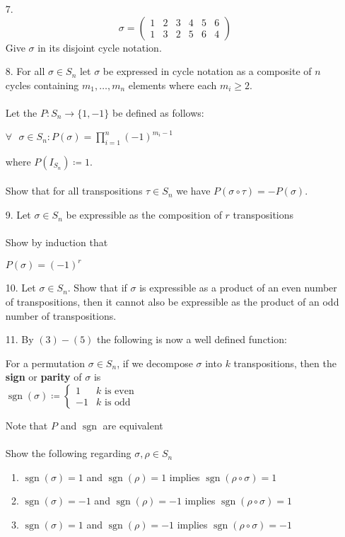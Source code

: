 \documentclass{article}
\begin{document}
\begin{itemize}
    \item [7.] \[
        \sigma = \begin{pmatrix}
        1 & 2 & 3 & 4 & 5 & 6 \\
        1 & 3 & 2 & 5 & 6 & 4
        \end{pmatrix}
        \]
    Give $\sigma$ in its disjoint cycle notation.
    \item [8.] For all $\sigma\in S_n$ let $\sigma$ be expressed in cycle notation as a composite of $n$ cycles containing $m_1,\dots,m_n$ elements where each $m_i \ge 2$. 
    \text{}\\\\Let the $P: S_n\rightarrow \{1, -1\}$ be defined as follows:
    \begin{center}
        $\forall\text{ }\sigma\in S_n\colon P(\sigma) = \prod_{i=1}^n(-1)^{m_i-1}$
    \end{center}
    where $P(I_{S_n}) \coloneq 1$. 
    \text{}\\\\Show that for all transpositions $\tau\in S_n$ we have $P(\sigma\circ\tau) = -P(\sigma)$.
    \item [9.] Let $\sigma\in S_n$ be expressible as the composition of $r$ transpositions\text{}\\\\Show by induction that
    \begin{center}
        $P(\sigma) = (-1)^r$
    \end{center}
    \item [10.] Let $\sigma\in S_n$. Show that if $\sigma$ is expressible as a product of an even number of transpositions, then it cannot also be expressible as the product of an odd number of transpositions.
    \item [11.] By $(3)-(5)$ the following is now a well defined function:
    \begin{center}
        For a permutation $\sigma\in S_n$, if we decompose $\sigma$ into $k$ transpositions, then the \textbf{sign} or \textbf{parity} of $\sigma$ is \text{}\\
        $\operatorname{sgn}(\sigma) \coloneq\begin{cases} 
      1 & k\text{ is even} \\
      -1 & k\text{ is odd}
    \end{cases}$
    \end{center}
    Note that $P$ and $\operatorname{sgn}$ are equivalent
    \text{}\\\\Show the following regarding $\sigma, \rho\in S_n$
    \begin{enumerate}
        \item $\operatorname{sgn}(\sigma) = 1$ and $\operatorname{sgn}(\rho) = 1$ implies $\operatorname{sgn}(\rho\circ\sigma) = 1$
        \item $\operatorname{sgn}(\sigma) = -1$ and $\operatorname{sgn}(\rho) = -1$ implies $\operatorname{sgn}(\rho\circ\sigma) = 1$
        \item $\operatorname{sgn}(\sigma) = 1$ and $\operatorname{sgn}(\rho) = -1$ implies $\operatorname{sgn}(\rho\circ\sigma) = -1$
    \end{enumerate}
\end{itemize}
\end{document}
